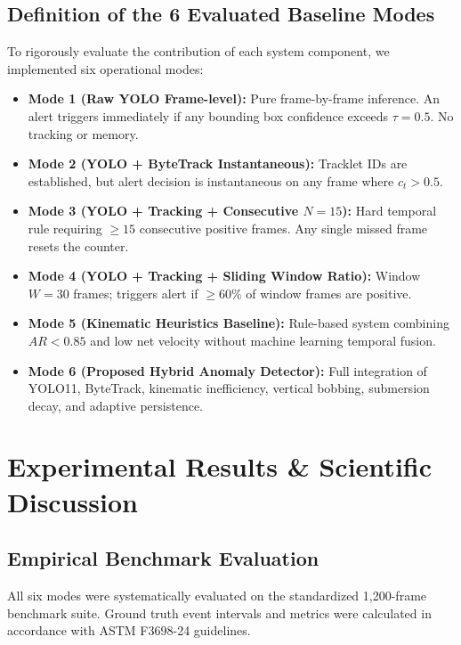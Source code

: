 \documentclass[a4paper,11pt]{article}
\begin{document}
\subsection{Definition of the 6 Evaluated Baseline Modes}
To rigorously evaluate the contribution of each system component, we implemented six operational modes:
\begin{itemize}
    \item \textbf{Mode 1 (Raw YOLO Frame-level):} Pure frame-by-frame inference. An alert triggers immediately if any bounding box confidence exceeds $\tau=0.5$. No tracking or memory.
    \item \textbf{Mode 2 (YOLO + ByteTrack Instantaneous):} Tracklet IDs are established, but alert decision is instantaneous on any frame where $c_t > 0.5$.
    \item \textbf{Mode 3 (YOLO + Tracking + Consecutive $N=15$):} Hard temporal rule requiring $\ge 15$ consecutive positive frames. Any single missed frame resets the counter.
    \item \textbf{Mode 4 (YOLO + Tracking + Sliding Window Ratio):} Window $W=30$ frames; triggers alert if $\ge 60\%$ of window frames are positive.
    \item \textbf{Mode 5 (Kinematic Heuristics Baseline):} Rule-based system combining $AR < 0.85$ and low net velocity without machine learning temporal fusion.
    \item \textbf{Mode 6 (Proposed Hybrid Anomaly Detector):} Full integration of YOLO11, ByteTrack, kinematic inefficiency, vertical bobbing, submersion decay, and adaptive persistence.
\end{itemize}

\section{Experimental Results \& Scientific Discussion}

\subsection{Empirical Benchmark Evaluation}
All six modes were systematically evaluated on the standardized 1,200-frame benchmark suite. Ground truth event intervals and metrics were calculated in accordance with ASTM F3698-24 guidelines.
\end{document}
